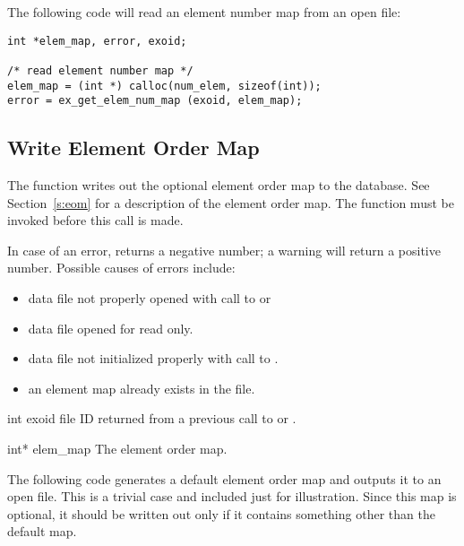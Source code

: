 The following code will read an element number map from an
open \exo{} file:
\begin{lstlisting}
int *elem_map, error, exoid;

/* read element number map */
elem_map = (int *) calloc(num_elem, sizeof(int));
error = ex_get_elem_num_map (exoid, elem_map);
\end{lstlisting}

\subsection{Write Element Order Map}

The function  writes out the optional element
order map to the database. See Section~\ref{s:eom} for a description
of the element order map. The function  must be
invoked before this call is made.

In case of an error,  returns a negative
number; a warning will return a positive number.
Possible causes of errors include:

\begin{itemize}
 \item data file not properly opened with call to 
 or 

 \item data file opened for read only.

 \item data file not initialized properly with call to
 .

 \item an element map already exists in the file.
\end{itemize}



\begin{parameters}
\item[{int exoid \R{}}]
\exo{} file ID returned from a previous call to 
or .

\item[{int* elem_map \R{}}]
The element order map.
\end{parameters}

The following code generates a default element order map and outputs
it to an open \exo{} file. This is a trivial case and included just
for illustration. Since this map is optional, it should be written out
only if it contains something other than the default map.

